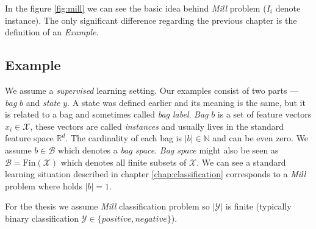 In the figure \ref{fig:mill} we can see the basic idea behind \emph{Mill} problem ($I_i$ denote instance). The only significant difference regarding the previous chapter is the definition of an \emph{Example}. 
\subsection*{Example}
We assume a \emph{supervised} learning setting. Our examples consist of two parts --- \emph{bag} $b$ and \emph{state} $y$. A state was defined earlier and its meaning is the same, but it is related to a bag and sometimes called \emph{bag label}. \emph{Bag} $b$ is a set of feature vectors $x_i\in\mathcal{X}$, these vectors are called \emph{instances} and usually lives in the standard feature space $\mathbb{R}^{d}$. The cardinality of each bag is $|b| \in \mathbb{N}$ and can be even zero. We assume $b \in \mathcal{B}$ which denotes a \emph{bag space}. \emph{Bag space} might also be seen as $\mathcal{B} = \mathrm{Fin}(\mathcal{X})$ which denotes all finite subsets of $\mathcal{X}$. We can see a standard learning situation described in chapter \ref{chap:classification} corresponds to a \emph{Mill} problem where holds $|b| = 1$.

For the thesis we assume \emph{Mill} classification problem so $|\mathcal{Y}|$ is finite (typically binary classification $\mathcal{Y} \in \{positive, negative\}$). 

